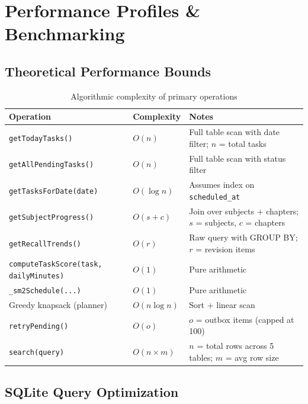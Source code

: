 \documentclass[12pt,a4paper,openany]{report}
\begin{document}
\chapter{Performance Profiles \& Benchmarking}

\section{Theoretical Performance Bounds}

\begin{table}[H]
\centering
\caption{Algorithmic complexity of primary operations}
\label{tab:complexity}
\begin{tabular}{lll}
\toprule
\textbf{Operation} & \textbf{Complexity} & \textbf{Notes} \\
\midrule
\texttt{getTodayTasks()} & $O(n)$ & Full table scan with date filter; $n$ = total tasks \\
\texttt{getAllPendingTasks()} & $O(n)$ & Full table scan with status filter \\
\texttt{getTasksForDate(date)} & $O(\log n)$ & Assumes index on \texttt{scheduled\_at} \\
\texttt{getSubjectProgress()} & $O(s + c)$ & Join over subjects + chapters; $s$ = subjects, $c$ = chapters \\
\texttt{getRecallTrends()} & $O(r)$ & Raw query with GROUP BY; $r$ = revision items \\
\texttt{computeTaskScore(task, dailyMinutes)} & $O(1)$ & Pure arithmetic \\
\texttt{\_sm2Schedule(...)} & $O(1)$ & Pure arithmetic \\
Greedy knapsack (planner) & $O(n \log n)$ & Sort + linear scan \\
\texttt{retryPending()} & $O(o)$ & $o$ = outbox items (capped at 100) \\
\texttt{search(query)} & $O(n \times m)$ & $n$ = total rows across 5 tables; $m$ = avg row size \\
\bottomrule
\end{tabular}
\end{table}

\section{SQLite Query Optimization}
\end{document}

